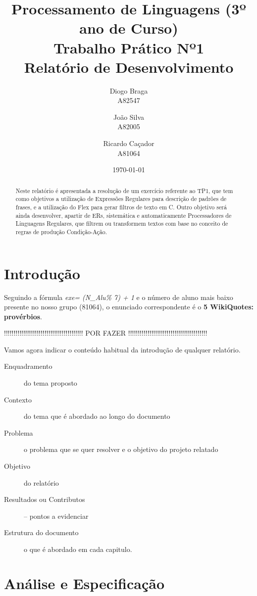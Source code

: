 \documentclass[11pt,a4paper]{report}
\title{Processamento de Linguagens (3º ano de Curso)\\
	\textbf{Trabalho Prático Nº1}\\ Relatório de Desenvolvimento}
\author{Diogo Braga\\ A82547 \and João Silva\\ A82005 \and Ricardo Caçador\\ A81064}
\date{\today}
\begin{document}
\maketitle

\begin{abstract}
	Neste relatório é apresentada a resolução de um exercício referente ao TP1, que tem como objetivos a utilização de Expressões Regulares para descrição de padrões de frases, e a utilização do Flex para gerar filtros de texto em C.
Outro objetivo será ainda desenvolver, apartir de ERs, sistemática e automaticamente Processadores de Linguagens Regulares, que filtrem ou transformem textos com base no conceito de regras de produção Condição-Ação.
\end{abstract}

\tableofcontents

\newpage

\chapter{Introdução}
\label{chap:intro}

Seguindo a fórmula \emph{exe= (N\_Alu\% 7) + 1} e o número de aluno mais baixo presente no nosso grupo (81064), o enunciado correspondente é o \textbf{5 WikiQuotes: provérbios}.


!!!!!!!!!!!!!!!!!!!!!!!!!!!!!!!!!!!!!!!!! POR FAZER !!!!!!!!!!!!!!!!!!!!!!!!!!!!!!!!!!!!!!!!!


Vamos agora indicar o conteúdo habitual da introdução de qualquer relatório.
\begin{description}  %
  \item[Enquadramento]  do tema proposto
  \item[Contexto] do tema que é abordado ao  longo do documento
  \item[Problema] o problema que se quer resolver e o objetivo do projeto relatado
  \item[Objetivo] do relatório
  \item[Resultados ou Contributos] -- pontos a evidenciar
  \item[Estrutura do documento] o que é abordado em cada capitulo.
\end{description}



\chapter{Análise e Especificação}
\label{chap:analise}
\end{document}
